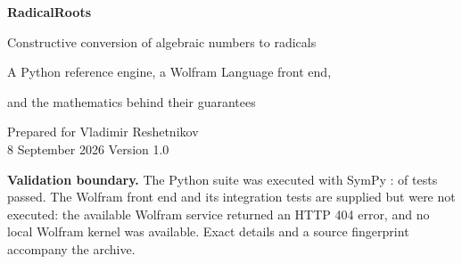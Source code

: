 \documentclass[11pt,a4paper]{article}
\theoremstyle{definition}\newtheorem{definition}[theorem]{Definition}
\theoremstyle{remark}\newtheorem{remark}[theorem]{Remark}
\newcommand{\code}[1]{\texttt{#1}}
\begin{document}
\begin{titlepage}
\vspace*{10mm}
{\color{ink}\Huge\bfseries RadicalRoots\par}
\vspace{4mm}
{\LARGE Constructive conversion of algebraic numbers to radicals\par}
\vspace{8mm}
{\large A Python reference engine, a Wolfram Language front end,\par
and the mathematics behind their guarantees\par}
\vspace{12mm}
Prepared for Vladimir Reshetnikov\\
8 September 2026 \quad\textbar\quad Version 1.0
\vspace{12mm}
\begin{abstract}
An algebraic number has a radical expression precisely when the Galois group
of its irreducible minimal polynomial is solvable. Turning this criterion into
usable code requires considerably more than naming a Galois group: one must
construct radical generators, represent every radicand in an earlier field,
and select the correct complex branches. This report develops an explicit
algorithm using splitting fields, prime cyclic quotients, rational nullspaces,
and exact tower coordinates. A relative-automorphism construction avoids a
second, potentially much larger, factorization after adjoining roots of unity.
Finite trace-projector candidates substantially improve expression size.

The accompanying Python implementation contains this general construction,
structural shortcuts, a non-executable JSON radical format, and a separate
arithmetic-tower checker. The Wolfram Language package calls the engine and
checks the final answer with \code{RootReduce}. The two motivating examples
receive especially short solutions: a reciprocal sextic reduces to a cubic,
and a quintic is a Dickson polynomial. The mathematical algorithm is complete
with exact algebraic primitives and without resource limits. The software is
a reference implementation, not a claim of unrestricted practical performance
or a formally verified theorem prover.
\end{abstract}
\vfill
\textbf{Validation boundary.} The Python suite was executed with SymPy
\TestSymPy{}: \TestPassed{} of \TestCount{} tests passed. The Wolfram front end
and its integration tests are supplied but were not executed: the available
Wolfram service returned an HTTP 404 error, and no local Wolfram kernel was
available. Exact details and a source fingerprint accompany the archive.
\end{titlepage}
\begingroup
\small
\setlength{\parskip}{0pt}
\tableofcontents
\endgroup
\newpage
\end{document}
